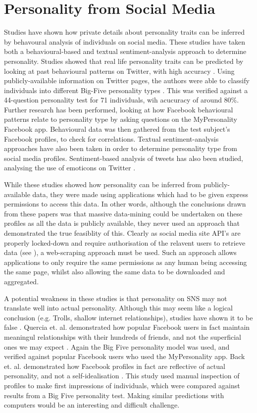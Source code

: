 \section{Personality from Social Media}

Studies have shown how private details about personality traits can be inferred by behavoural analysis of individuals on social media. These studies have taken both a behavioural-based and textual sentiment-analysis approach to determine personality. Studies showed that real life personality traits can be predicted by looking at past behavioural patterns on Twitter, with high accuracy \cite{}. Using publicly-available information on Twitter pages, the authors were able to classify individuals into different Big-Five personality types \cite{}. This was verified against a 44-question personality test for 71 individuals, wih acucuracy of around 80\%. Further research has been performed, looking at how Facebook behavioural patterns relate to personality type by asking questions on the MyPersonality Facebook app. Behavioural data was then gathered from the test subject's Facebook profiles, to check for correlations. Textual sentiment-analysis approaches have also been taken in order to determine personality type 
from social media profiles. Sentiment-based analysis of tweets has also been studied, analysing the use of emoticons on Twitter \cite{}.

While these studies showed how personality can be inferred from publicly-available data, they were made using applications which had to be given express permissions to access this data. In other words, although the conclusions drawn from these papers was that massive data-mining could be undertaken on these profiles as all the data is publicly available, they never used an approach that demonstrated the true feasiblity of this. Clearly as social media site API's are properly locked-down and require authorisation of the relavent users to retrieve data (see \cite{}), a web-scraping approach must be used. Such an approach allows applications to only require the same permissions as any human being accessing the same page, whilst also allowing the same data to be downloaded and aggregated. 

A potential weakness in these studies is that personality on SNS may not translate well into actual personality. Although this may seem like a logical conclusion (e.g. Trolls, shallow internet relationships), studies have shown it to be false \cite{}. Quercia et. al. demonstrated how popular Facebook users in fact maintain meaningul relationships with their hundreds of friends, and not the superficial ones we may expect \cite{}. Again the Big Five personality model was used, and verified against popular Facebook users who used the MyPersonality app. Back et. al. demonstrated how Facebook profiles in fact are reflective of actual personality, and not a self-idealisation \cite{}. This study used manual inspection of profiles to make first impressions of individuals, which were compared against results from a Big Five personality test. Making similar predictions with computers would be an interesting and difficult challenge. 

